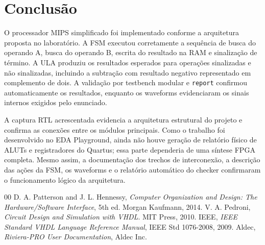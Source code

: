\documentclass[conference]{IEEEtran}
\begin{document}
\section{Conclusão}
O processador MIPS simplificado foi implementado conforme a arquitetura proposta no laboratório. A FSM executou corretamente a sequência de busca do operando A, busca do operando B, escrita do resultado na RAM e sinalização de término. A ULA produziu os resultados esperados para operações sinalizadas e não sinalizadas, incluindo a subtração com resultado negativo representado em complemento de dois. A validação por testbench modular e \texttt{report} confirmou automaticamente os resultados, enquanto os waveforms evidenciaram os sinais internos exigidos pelo enunciado.

A captura RTL acrescentada evidencia a arquitetura estrutural do projeto e confirma as conexões entre os módulos principais. Como o trabalho foi desenvolvido no EDA Playground, ainda não houve geração de relatório físico de ALUTs e registradores do Quartus; essa parte dependeria de uma síntese FPGA completa. Mesmo assim, a documentação dos trechos de interconexão, a descrição das ações da FSM, os waveforms e o relatório automático do checker confirmaram o funcionamento lógico da arquitetura.

\begin{thebibliography}{00}
 D. A. Patterson and J. L. Hennessy, \textit{Computer Organization and Design: The Hardware/Software Interface}, 5th ed. Morgan Kaufmann, 2014.
 V. A. Pedroni, \textit{Circuit Design and Simulation with VHDL}. MIT Press, 2010.
 IEEE, \textit{IEEE Standard VHDL Language Reference Manual}, IEEE Std 1076-2008, 2009.
 Aldec, \textit{Riviera-PRO User Documentation}, Aldec Inc.
\end{thebibliography}
\end{document}
